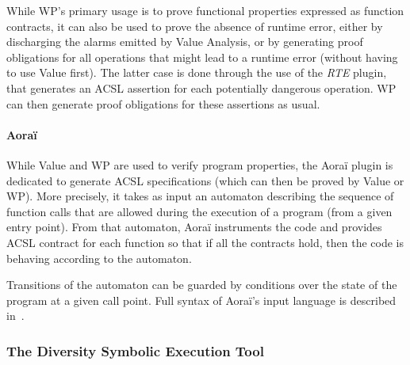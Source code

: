 \documentclass{template/openetcs_report}
\begin{document}
While WP's primary usage is to prove functional properties expressed as 
function contracts, it can also be used to prove the absence of runtime error,
either by discharging the alarms emitted by Value Analysis, or by generating
proof obligations for all operations that might lead to a runtime error 
(without having to use Value first). The latter case is done through the use
of the \emph{RTE} plugin, that generates an ACSL assertion for each potentially
dangerous operation. WP can then generate proof obligations for these assertions
as usual.

\paragraph{Aoraï}
While Value and WP are used to verify program properties, the Aoraï plugin is
dedicated to generate ACSL specifications (which can then be proved by Value
or WP). More precisely, it takes as input an automaton describing the sequence
of function calls that are allowed during the execution of a program (from a
given entry point). From that automaton, Aoraï instruments the code and provides
ACSL contract for each function so that if all the contracts hold, then the
code is behaving according to the automaton.

Transitions of the automaton can be guarded by conditions over the state of the
program at a given call point. Full syntax of Aoraï's input language is 
described in~\cite{aorai}.




\subsubsection{The Diversity Symbolic Execution Tool}
\end{document}
